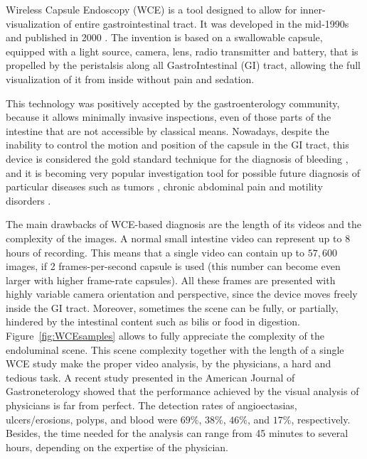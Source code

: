 \documentclass[review,12pt,3p]{elsarticle}
\begin{document}
Wireless Capsule Endoscopy (WCE) is a tool designed to allow for inner-visualization of entire gastrointestinal tract. It was developed in the mid-1990s and published in 2000 \cite{iddan2000wireless}. %
The invention is based on a swallowable capsule, equipped with a light source, camera, lens, radio transmitter and battery, that is propelled by the peristalsis along all GastroIntestinal (GI) tract, allowing the full visualization of it from inside without pain and sedation.

This technology was positively accepted by the gastroenterology community, because it allows minimally invasive inspections, even of those parts of the intestine that are not accessible by classical means.
Nowadays, despite the inability to control the motion and position of the capsule in the GI tract, this device is considered the gold standard technique for the diagnosis of  bleeding \cite{eliakim2004wireless,mustafa2013small}, and it is becoming very popular investigation tool for  possible future diagnosis of particular diseases such as tumors \cite{tumor2006,tumor2010}, chronic abdominal pain \cite{YangPlosOne} and motility disorders \cite{malagelada2012functional}.

The main drawbacks of WCE-based diagnosis are the length of its videos and the complexity of the images. A normal small intestine video can represent up to 8 hours of recording. This means that a single video can contain up to $57,600$ images, if 2 frames-per-second capsule is used (this number can become even larger with higher frame-rate capsules). All these frames are presented with highly variable camera orientation and perspective, since the device moves freely inside the GI tract. Moreover, sometimes the scene can be fully, or partially, hindered by the intestinal content such as bilis or food in digestion. Figure~\ref{fig:WCEsamples} allows  to fully appreciate the complexity of the endoluminal scene.
This scene complexity together with the length of a single WCE study make the proper video analysis, by the physicians, a hard and tedious task. A recent study presented in the American Journal of Gastroneterology \cite{zheng2012detection} showed that the performance achieved by the visual analysis of physicians is far from perfect.
The detection rates of angioectasias, ulcers/erosions, polyps, and blood were $69\%$, $38\%$, $46\%$, and $17\%$, respectively. Besides, the time needed for the analysis can range from 45 minutes to several hours, depending on the expertise of the physician.
\end{document}
